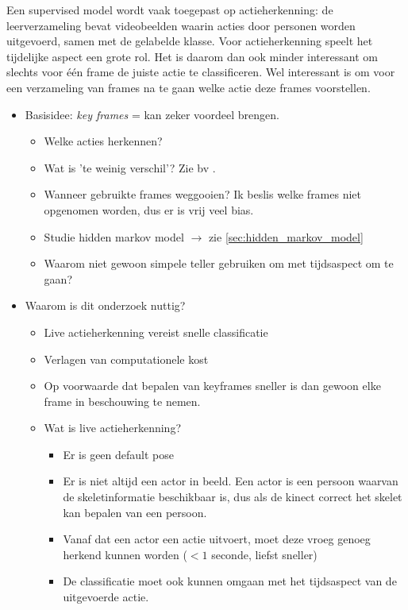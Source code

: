 Een supervised model wordt vaak toegepast op actieherkenning: de leerverzameling bevat videobeelden waarin acties door personen worden uitgevoerd, samen met de gelabelde klasse. Voor actieherkenning speelt het tijdelijke aspect een grote rol. Het is daarom dan ook minder interessant om slechts voor één frame de juiste actie te classificeren. Wel interessant is om voor een verzameling van frames na te gaan welke actie deze frames voorstellen. 




\begin{itemize}
	\item Basisidee: \textit{key frames} = kan zeker voordeel brengen.
	
	\begin{itemize}
		\item Welke acties herkennen?  
		\item Wat is 'te weinig verschil'? Zie bv \cite{Suolan2017}.
		\item Wanneer gebruikte frames weggooien? Ik beslis welke frames niet opgenomen worden, dus er is vrij veel bias.
		\item Studie hidden markov model $\rightarrow$ zie \ref{sec:hidden_markov_model}
		\item Waarom niet gewoon simpele teller gebruiken om met tijdsaspect om te gaan?
	\end{itemize}

	\item Waarom is dit onderzoek nuttig? 
	\begin{itemize}
		\item Live actieherkenning vereist snelle classificatie
		\item Verlagen van computationele kost
		\item Op voorwaarde dat bepalen van keyframes sneller is dan gewoon elke frame in beschouwing te nemen. 
		\item Wat is live actieherkenning? 
		\begin{itemize}
			\item Er is geen default pose
			\item Er is niet altijd een actor in beeld. Een actor is een persoon waarvan de skeletinformatie beschikbaar is, dus als de kinect correct het skelet kan bepalen van een persoon.
			\item Vanaf dat een actor een actie uitvoert, moet deze vroeg genoeg herkend kunnen worden ($< 1$ seconde, liefst sneller)
			\item De classificatie moet ook kunnen omgaan met het tijdsaspect van de uitgevoerde actie.
		\end{itemize}
	\end{itemize}


\end{itemize}

